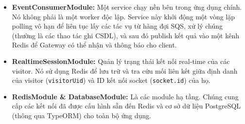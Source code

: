 \begin{itemize}
    \item \textbf{EventConsumerModule:} Một service chạy nền bên trong ứng dụng chính. Nó không phải là một worker độc lập. Service này khởi động một vòng lặp polling vô hạn để liên tục lấy các tác vụ từ hàng đợi SQS, xử lý chúng (thường là các thao tác ghi CSDL), và sau đó publish kết quả vào một kênh Redis để Gateway có thể nhận và thông báo cho client.

    \item \textbf{RealtimeSessionModule:} Quản lý trạng thái kết nối real-time của các visitor. Nó sử dụng Redis để lưu trữ và tra cứu mối liên kết giữa định danh của visitor (\texttt{visitorUid}) và ID kết nối socket (\texttt{socket.id}) của họ.

    \item \textbf{RedisModule \& DatabaseModule:} Là các module hạ tầng. Chúng cung cấp các kết nối đã được cấu hình sẵn đến Redis và cơ sở dữ liệu PostgreSQL (thông qua TypeORM) cho toàn bộ ứng dụng.
\end{itemize}